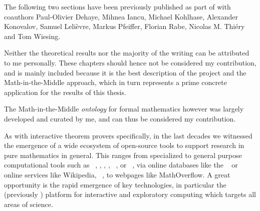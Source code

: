 

\begin{disclaimer*}
	The following two sections have been previously published as part of \cite{DehKohKon:iop16} with coauthors Paul-Olivier Dehaye, Mihnea Iancu, Michael Kohlhase, Alexander Konovalov, Samuel Leli{\`e}vre, Markus Pfeiffer, Florian Rabe, Nicolas M. Thi{\'e}ry and Tom Wiesing.
	
	Neither the theoretical results nor the majority of the writing can be attributed to me personally. These chapters should hence not be considered my contribution, and is mainly included because it is the best description of the \ODK project and the Math-in-the-Middle approach, which in turn represents a prime concrete application for the results of this thesis.
	
	The Math-in-the-Middle \emph{ontology} for formal mathematics however was largely developed and curated by me, and can thus be considered my contribution.
\end{disclaimer*}

As with interactive theorem provers specifically, in the last decades we witnessed the emergence 
of a wide ecosystem of open-source tools to support research in pure mathematics in general. 
This ranges from specialized to general purpose
computational tools such as \GAP~\cite{gap}, \PariGP, \Linbox, \MPIR, \Sage~\cite{sage}, or \Singular~\cite{singular:on}, via online
databases like the \LMFDB~\cite{lmfdb} or online services like Wikipedia,
\Arxiv~\cite{arxiv}, to webpages like MathOverflow.
A great opportunity is the rapid emergence of key technologies,
in particular the \Jupyter~\cite{jupyter-project:on} (previously \IPython) platform for interactive and
exploratory computing which targets all areas of science.

